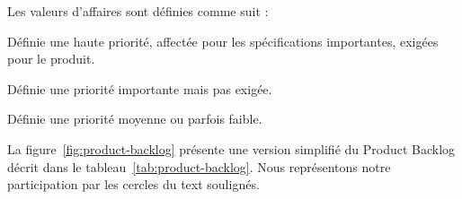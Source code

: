 Les valeurs d'affaires sont définies comme suit :
\begin{description}[align=right,labelwidth=1cm]
    \item [1] Définie une haute priorité, affectée pour les spécifications
        importantes, exigées pour le produit.
    \item [2] Définie une priorité importante mais pas exigée.
    \item [3] Définie une priorité moyenne ou parfois faible.
\end{description}

La figure~\ref{fig:product-backlog} présente une version simplifié du Product
Backlog décrit dans le tableau~\ref{tab:product-backlog}. Nous représentons
notre participation par les cercles du text soulignés.



